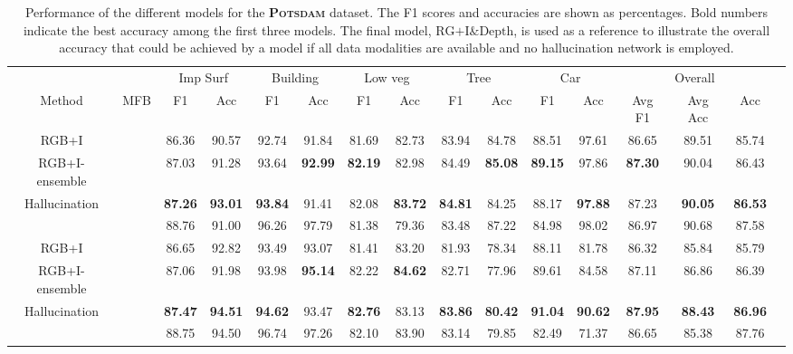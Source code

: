 \documentclass[journal]{IEEEtran}
\newcommand{\cmark}{\ding{51}}%
\newcommand{\xmark}{\ding{55}}%
\begin{document}
\begin{table*}[t]
\begin{center}
\begin{tabular}{lc|c|c|c|c|c|c|c|c|c|c|c|c|c|c|}
\cline{3-15}
& & \multicolumn{2}{|c|}{Imp Surf} & \multicolumn{2}{c|}{Building} & \multicolumn{2}{c|}{Low veg} & \multicolumn{2}{c|}{Tree} & \multicolumn{2}{c|}{Car} & \multicolumn{3}{c|}{Overall}\\
\cline{1-15}
\multicolumn{1}{|c|}{Method} & \multicolumn{1}{|c|}{MFB} & F1 & Acc & F1 & Acc & F1 & Acc & F1 & Acc & F1 & Acc & Avg F1 & Avg Acc & Acc\\
\cline{1-15}
\multicolumn{1}{|c|}{RGB+I} & \cmark & 86.36 & 90.57 & 92.74 & 91.84 & 81.69 & 82.73 & 83.94 & 84.78 & 88.51 & 97.61 & 86.65 & 89.51 & 85.74\\
\cline{2-15}
\multicolumn{1}{|c|}{RGB+I-ensemble} & \cmark & 87.03 & 91.28 & 93.64 & {\bf92.99} & {\bf82.19} & 82.98 & 84.49 & {\bf85.08} & {\bf89.15} & 97.86 & {\bf87.30} & 90.04 & 86.43 \\
\cline{2-15}
\multicolumn{1}{|c|}{Hallucination} & \cmark & {\bf87.26} & {\bf93.01} & {\bf93.84} & 91.41 & 82.08 & {\bf83.72} & {\bf84.81} & 84.25 & 88.17 & {\bf97.88} & 87.23 & {\bf90.05} & {\bf86.53} \\
\hdashline
\multicolumn{1}{|c|}{RGB+I\&Depth} & \cmark & 88.76 & 91.00 & 96.26 & 97.79 & 81.38 & 79.36 & 83.48 & 87.22 & 84.98 & 98.02 & 86.97 & 90.68 & 87.58 \\
\hline
\hline
\multicolumn{1}{|c|}{RGB+I} & \xmark & 86.65 & 92.82 & 93.49 & 93.07 & 81.41 & 83.20 & 81.93 & 78.34 & 88.11 & 81.78 & 86.32 & 85.84 & 85.79\\
\hline
\multicolumn{1}{|c|}{RGB+I-ensemble} & \xmark & 87.06 & 91.98 & 93.98 & {\bf95.14} & 82.22 & {\bf84.62} & 82.71 & 77.96 & 89.61 & 84.58 & 87.11 & 86.86 & 86.39 \\
\hline
\multicolumn{1}{|c|}{Hallucination} & \xmark & {\bf87.47} & {\bf94.51} & {\bf94.62} & 93.47 & {\bf82.76} & 83.13 & {\bf83.86} & {\bf80.42} & {\bf91.04} & {\bf90.62} & {\bf87.95} & {\bf88.43} & {\bf86.96}\\
\hdashline
\multicolumn{1}{|c|}{RGB+I\&Depth} & \xmark & 88.75 & 94.50 & 96.74 & 97.26 & 82.10 & 83.90 & 83.14 & 79.85 & 82.49 & 71.37 & 86.65 & 85.38 & 87.76\\
\hline
\end{tabular}
\vspace{0.2cm}
\caption{Performance of the different models for the {\bf\scshape Potsdam} dataset. The F1 scores and accuracies are shown as percentages. Bold numbers indicate the best accuracy among the first three models. The final model, $\text{RG+I\&Depth}$, is used as a reference to illustrate the overall accuracy that could be achieved by a model if all data modalities are available and no hallucination network is employed.}
\label{tab:resultsMFBPotsdam}
\end{center}
\end{table*}
\end{document}
